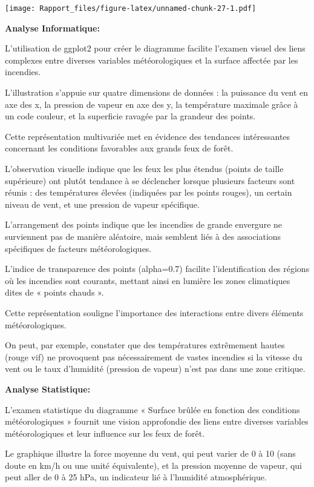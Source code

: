 \documentclass[
]{article}
\begin{document}
\texttt{[image: Rapport\_files/figure-latex/unnamed-chunk-27-1.pdf]}

\textbf{Analyse Informatique:}

L'utilisation de ggplot2 pour créer le diagramme facilite l'examen
visuel des liens complexes entre diverses variables météorologiques et
la surface affectée par les incendies.

L'illustration s'appuie sur quatre dimensions de données : la puissance
du vent en axe des x, la pression de vapeur en axe des y, la température
maximale grâce à un code couleur, et la superficie ravagée par la
grandeur des points.

Cette représentation multivariée met en évidence des tendances
intéressantes concernant les conditions favorables aux grands feux de
forêt.

L'observation visuelle indique que les feux les plus étendus (points de
taille supérieure) ont plutôt tendance à se déclencher lorsque plusieurs
facteurs sont réunis : des températures élevées (indiquées par les
points rouges), un certain niveau de vent, et une pression de vapeur
spécifique.

L'arrangement des points indique que les incendies de grande envergure
ne surviennent pas de manière aléatoire, mais semblent liés à des
associations spécifiques de facteurs météorologiques.

L'indice de transparence des points (alpha=0.7) facilite
l'identification des régions où les incendies sont courants, mettant
ainsi en lumière les zones climatiques dites de « points chauds ».

Cette représentation souligne l'importance des interactions entre divers
éléments météorologiques.

On peut, par exemple, constater que des températures extrêmement hautes
(rouge vif) ne provoquent pas nécessairement de vastes incendies si la
vitesse du vent ou le taux d'humidité (pression de vapeur) n'est pas
dans une zone critique.

\textbf{Analyse Statistique:}

L'examen statistique du diagramme « Surface brûlée en fonction des
conditions météorologiques » fournit une vision approfondie des liens
entre diverses variables météorologiques et leur influence sur les feux
de forêt.

Le graphique illustre la force moyenne du vent, qui peut varier de 0 à
10 (sans doute en km/h ou une unité équivalente), et la pression moyenne
de vapeur, qui peut aller de 0 à 25 hPa, un indicateur lié à l'humidité
atmosphérique.
\end{document}
